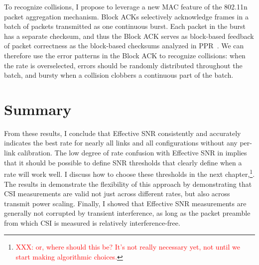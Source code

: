 
To recognize collisions, I propose to leverage a new MAC feature of the 802.11n packet aggregation mechanism. Block ACKs selectively acknowledge frames in a batch of packets transmitted as one continuous burst. Each packet in the burst has a separate checksum, and thus the Block ACK serves as block-based feedback of packet correctness as the block-based checksums analyzed in PPR~\cite{Jamieson_PPR}. We can therefore use the error patterns in the Block ACK to recognize collisions: when the rate is overselected, errors should be randomly distributed throughout the batch, and bursty when a collision clobbers a continuous part of the batch.

\section{Summary}
From these results, I conclude that Effective SNR consistently and accurately indicates the best rate for nearly all links and all configurations without any per-link calibration. The low degree of rate confusion with Effective SNR in  implies that it should be possible to define SNR thresholds that clearly define when a rate will work well. I discuss how to choose these thresholds in the next chapter,\footnote{\textcolor{red}{XXX: or, where should this be? It's not really necessary yet, not until we start making algorithmic choices.}}. The results in  demonstrate the flexibility of this approach by demonstrating that CSI measurements are valid not just across different rates, but also across transmit power scaling. Finally, I showed that Effective SNR measurements are generally not corrupted by transient interference, as long as the packet preamble from which CSI is measured is relatively interference-free.

